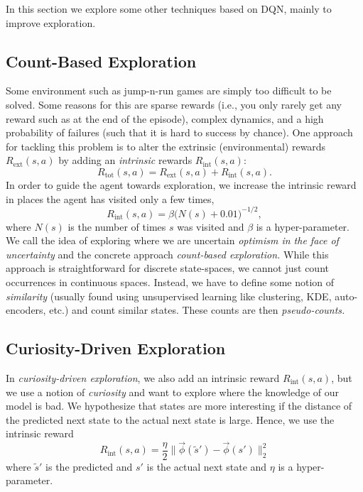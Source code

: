 		In this section we explore some other techniques based on \ac{DQN}, mainly to improve exploration.

		\subsection{Count-Based Exploration}
			Some environment such as jump-n-run games are simply too difficult to be solved. Some reasons for this are sparse rewards (i.e., you only rarely get any reward such as at the end of the episode), complex dynamics, and a high probability of failures (such that it is hard to success by chance). One approach for tackling this problem is to alter the extrinsic (environmental) rewards \(R_\mathrm{ext}(s, a)\) by adding an \emph{intrinsic} rewards \(R_\mathrm{int}(s, a)\):
			\begin{equation}
				R_\mathrm{tot}(s, a) = R_\mathrm{ext}(s, a) + R_\mathrm{int}(s, a).
			\end{equation}
			In order to guide the agent towards exploration, we increase the intrinsic reward in places the agent has visited only a few times,
			\begin{equation}
				R_\mathrm{int}(s, a) = \beta \bigl( N(s) + 0.01 \bigr)^{-1/2},
			\end{equation}
			where \(N(s)\) is the number of times \(s\) was visited and \(\beta\) is a hyper-parameter. We call the idea of exploring where we are uncertain \emph{optimism in the face of uncertainty} and the concrete approach \emph{count-based exploration.} While this approach is straightforward for discrete state-spaces, we cannot just count occurrences in continuous spaces. Instead, we have to define some notion of \emph{similarity} (usually found using unsupervised learning like clustering, \ac{KDE}, auto-encoders, etc.) and count similar states. These counts are then \emph{pseudo-counts.}

		\subsection{Curiosity-Driven Exploration}
			In \emph{curiosity-driven exploration}, we also add an intrinsic reward \(R_\mathrm{int}(s, a)\), but we use a notion of \emph{curiosity} and want to explore where the knowledge of our model is bad. We hypothesize that states are more interesting if the distance of the predicted next state to the actual next state is large. Hence, we use the intrinsic reward
			\begin{equation}
				R_\mathrm{int}(s, a) = \frac{\eta}{2} \bigl\lVert \vec{\phi}(\tilde{s}') - \vec{\phi}(s') \bigr\lVert_2^2
			\end{equation}
			where \(\tilde{s}'\) is the predicted and \(s'\) is the actual next state and \(\eta\) is a hyper-parameter.

